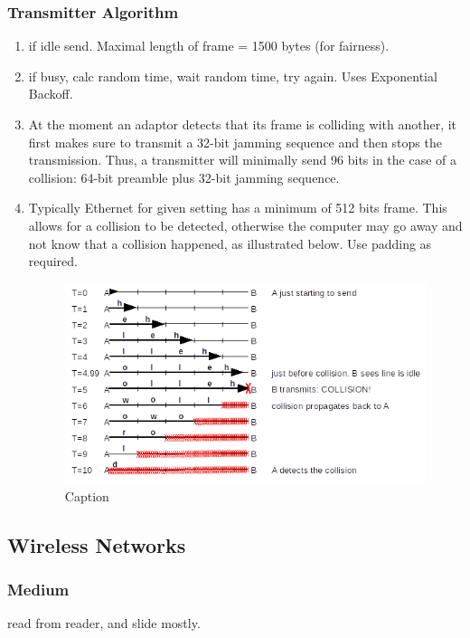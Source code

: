\documentclass[11pt, a4paper]{article}
\begin{document}
\subsubsection{Transmitter Algorithm}
\begin{enumerate}
    \item if idle send. Maximal length of frame = 1500 bytes (for fairness).
    \item if busy, calc random time, wait random time, try again. Uses Exponential Backoff.
    \item At the moment an adaptor detects that its frame is colliding with another, it first makes sure to transmit a 32-bit jamming sequence and then stops the transmission. Thus, a transmitter will minimally send 96 bits in the case of a collision: 64-bit preamble plus 32-bit jamming sequence.
    \item Typically Ethernet for given setting has a minimum of 512 bits frame. This allows for a collision to be detected, otherwise the computer may go away and not know that a collision happened, as illustrated below. Use padding as required.
    \begin{figure}[H]
        \centering
        \includegraphics[width = \textwidth]{Pictures/MultiAccess- Collision Detection.png}
        \caption{Caption}
        \label{fig:my_label}
    \end{figure}
\end{enumerate}

\subsection{Wireless Networks}
\subsubsection{Medium}
read from reader, and slide mostly.
\end{document}
